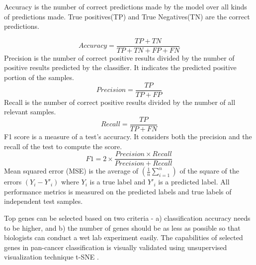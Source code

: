 \documentclass{bioinfo}
\begin{document}
Accuracy is the number of correct predictions made by the model over all kinds of predictions made. 
True positives(TP) and True Negatives(TN) are the correct predictions. 

    \begin{equation}
        Accuracy = \frac{TP+TN}{TP+TN+FP+FN}
    \end{equation}
    Precision is the number of correct positive results divided by the number of positive results predicted by the classifier. It indicates the predicted positive portion of the samples. 
    \begin{equation}
        Precision = \frac{TP}{TP+FP}
    \end{equation}
    Recall is the number of correct positive results divided by the number of all relevant samples.
    \begin{equation}
        Recall = \frac{TP}{TP+FN}
    \end{equation}
	F1 score is a measure of a test's accuracy. It considers both the precision and the recall of the test to compute the score.
	\begin{equation}
        F1 = 2 \times \frac{Precision \times Recall}{Precision + Recall}
    \end{equation}
    Mean squared error (MSE) is the average of $(\frac{1}{n} \sum _{i=1} ^n)$ of the square of the errors $(Y_i - Y'_i)$ where $Y_i$ is a true label and $Y'_i$ is a predicted label. All performance metrics is measured on the predicted labels and true labels of independent test samples. 

Top genes can be selected based on two criteria - a) classification accuracy needs to be higher,
and b) the number of genes should be as less as possible so that biologists can conduct a wet lab experiment
easily. The capabilities of selected genes in pan-cancer classification is visually validated using unsupervised visualization technique t-SNE \citep{maaten2008visualizing}.
\end{document}
